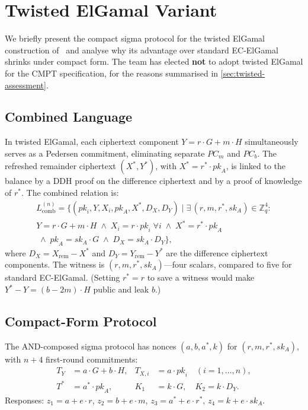 \documentclass[11pt]{article}
\theoremstyle{definition}
\newcommand{\Zq}{\mathbb{Z}_q}
\newcommand{\pk}{\mathit{pk}}
\newcommand{\sk}{\mathit{sk}}
\begin{document}
\appendix
\section{Twisted ElGamal Variant}
\label{app:twisted}

We briefly present the compact sigma protocol for the twisted ElGamal
construction of~\cite{Dore2026twisted} and analyse why its advantage
over standard EC-ElGamal shrinks under compact form.
The team has elected \textbf{not} to adopt twisted ElGamal for the
CMPT specification, for the reasons summarised in
\cref{sec:twisted-assessment}.

\subsection{Combined Language}

In twisted ElGamal, each ciphertext component $Y = r \cdot G + m \cdot H$
simultaneously serves as a Pedersen commitment, eliminating separate
$\mathit{PC}_m$ and $\mathit{PC}_b$.
The refreshed remainder ciphertext $(X^*, Y^*)$, with $X^* = r^* \cdot \pk_A$, is linked to the balance by a DDH
proof on the difference ciphertext and by a proof of knowledge of $r^*$.
The combined relation is:
\begin{multline*}
  L_{\mathrm{comb}}^{(n)} = \bigl\{
  (\pk_i, Y, X_i, \pk_A, X^*, D_X, D_Y) \;\big|\;
  \exists\,(r, m, r^*, \sk_A) \in \Zq^4: \\
  Y = r \cdot G + m \cdot H
  \;\wedge\;
  X_i = r \cdot \pk_i\; \forall i
  \;\wedge\;
  X^* = r^* \cdot \pk_A \\
  \;\wedge\;
  \pk_A = \sk_A \cdot G
  \;\wedge\;
  D_X = \sk_A \cdot D_Y
  \bigr\},
\end{multline*}
where $D_X = X_{\mathrm{rem}} - X^*$ and $D_Y = Y_{\mathrm{rem}} - Y^*$ are the difference ciphertext components.
The witness is $(r, m, r^*, \sk_A)$---four scalars, compared to five
for standard EC-ElGamal.
(Setting $r^* = r$ to save a witness would make $Y^* - Y = (b-2m) \cdot H$ public and leak $b$.)

\subsection{Compact-Form Protocol}

The AND-composed sigma protocol has nonces $(a, b, a^*, k)$ for
$(r, m, r^*, \sk_A)$, with $n + 4$ first-round commitments:
\begin{align*}
  T_Y &= a \cdot G + b \cdot H, &
  T_{X,i} &= a \cdot \pk_i \quad (i = 1, \ldots, n), \\
  T^* &= a^* \cdot \pk_A, &
  K_1 &= k \cdot G, \quad K_2 = k \cdot D_Y.
\end{align*}
Responses: $z_1 = a + e \cdot r$, $z_2 = b + e \cdot m$,
$z_3 = a^* + e \cdot r^*$, $z_4 = k + e \cdot \sk_A$.
\end{document}
